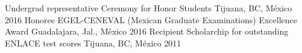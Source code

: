 \begin{cvhonors}
  \cvhonor
    {Undergrad representative}
    {Ceremony for Honor Students}
    {Tijuana, BC, México}
    {2016}
  \cvhonor
    {Honoree}
    {EGEL-CENEVAL (Mexican Graduate Examinations) Excellence Award}
    {Guadalajara, Jal., México}
    {2016}
  \cvhonor
    {Recipient}
    {Scholarchip for outstanding ENLACE test scores}
    {Tijuana, BC, México}
    {2011}
\end{cvhonors}
